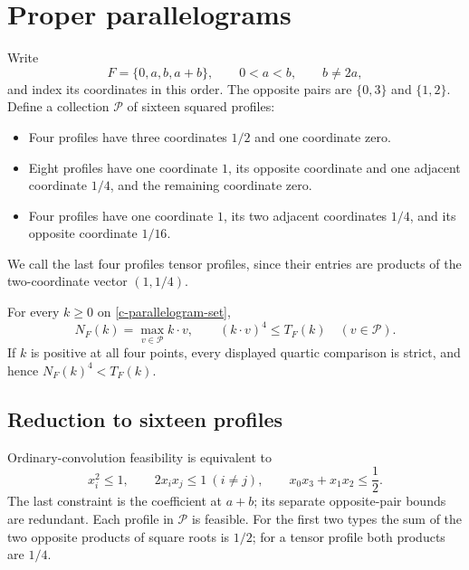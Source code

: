 \section{Proper parallelograms}
\label{sec:parallelogram}

Write
\begin{equation}\label{c-parallelogram-set}
 F=\{0,a,b,a+b\},\qquad 0<a<b,\qquad b\ne2a,
\end{equation}
and index its coordinates in this order.  The opposite pairs are
$\{0,3\}$ and $\{1,2\}$.  Define a collection $\mathcal P$ of sixteen
squared profiles:
\begin{itemize}
 \item Four profiles have three coordinates $1/2$ and one coordinate zero.
 \item Eight profiles have one coordinate $1$, its opposite coordinate
       and one adjacent coordinate $1/4$, and the remaining coordinate zero.
 \item Four profiles have one coordinate $1$, its two adjacent coordinates
       $1/4$, and its opposite coordinate $1/16$.
\end{itemize}
We call the last four profiles tensor profiles, since their entries are
products of the two-coordinate vector $(1,1/4)$.

\begin{proposition}\label{c-parallelogram}
For every $k\ge0$ on \eqref{c-parallelogram-set},
\begin{equation}\label{c-parallelogram-norm}
 N_F(k)=\max_{v\in\mathcal P}k\cdot v,
 \qquad (k\cdot v)^4\le T_F(k)\quad(v\in\mathcal P).
\end{equation}
If $k$ is positive at all four points, every displayed quartic comparison
is strict, and hence $N_F(k)^4<T_F(k)$.
\end{proposition}

\subsection{Reduction to sixteen profiles}

Ordinary-convolution feasibility is equivalent to
\begin{equation}\label{c-parallelogram-feasible}
 x_i^2\le1,\qquad 2x_ix_j\le1\ (i\ne j),\qquad
 x_0x_3+x_1x_2\le\frac12.
\end{equation}
The last constraint is the coefficient at $a+b$; its separate opposite-pair
bounds are redundant.  Each profile in $\mathcal P$ is feasible.
For the first two types the sum of the two opposite products of square
roots is $1/2$; for a tensor profile both products are $1/4$.

